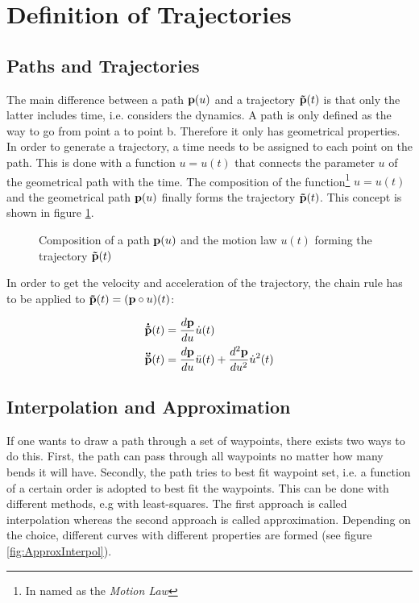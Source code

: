 \section{Definition of Trajectories}
\label{sec:definition}
\subsection{Paths and Trajectories}
The main difference between a path $ {\bf p}(u)$ and a trajectory $ {\bf \tilde{p}}(t)$ is that only the latter includes time, i.e. considers the dynamics. A path is only defined as the way to go from point a to point b. Therefore it only has geometrical properties. In order to generate a trajectory, a time needs to be assigned to each point on the path. This is done with a function $u=u(t)$ that connects the parameter $u$ of the geometrical path with the time. The composition of the function\footnote{In  \cite{snider} named as the \textit{Motion Law}} $u=u(t)$ and the geometrical path ${\bf p}(u)$ finally forms the trajectory ${\bf \tilde{p}}(t)$. This concept is shown in figure \ref{fig:path_trajectory}.
\begin{figure}[h]
\centering
\def\svgwidth{0.9\textwidth}

\caption{Composition of a path ${\bf p}(u)$ and the motion law $u(t)$ forming the trajectory ${\bf \tilde{p}}(t)$}
\label{fig:path_trajectory}
\end{figure}

In order to get the velocity and acceleration of the trajectory, the chain rule has to be applied to ${\bf \tilde{p}}(t)=({\bf p}\circ u)(t)$:

\begin{align}\label{vel_acc}
{\bf \dot{\tilde{p}}}(t) &= \frac{d {\bf p}}{du}\dot{u}(t) \\
{\bf \ddot{\tilde{p}}}(t) &= \frac{d {\bf p}}{du}\ddot{u}(t)+\frac{d^{2} {\bf p}}{du^{2}}\dot{u}^{2}(t)
\end{align}






\subsection{Interpolation and Approximation}
If one wants to draw a path through a set of waypoints, there exists two ways to do this. First, the path can pass through all waypoints no matter how many bends it will have. Secondly, the path tries to best fit waypoint set, i.e. a function of a  certain order is adopted to best fit the waypoints. This can be done with different methods, e.g with least-squares. The first approach is called interpolation whereas the second approach is called approximation. Depending on the choice, different curves with different properties are formed (see figure \ref{fig:ApproxInterpol}).  


